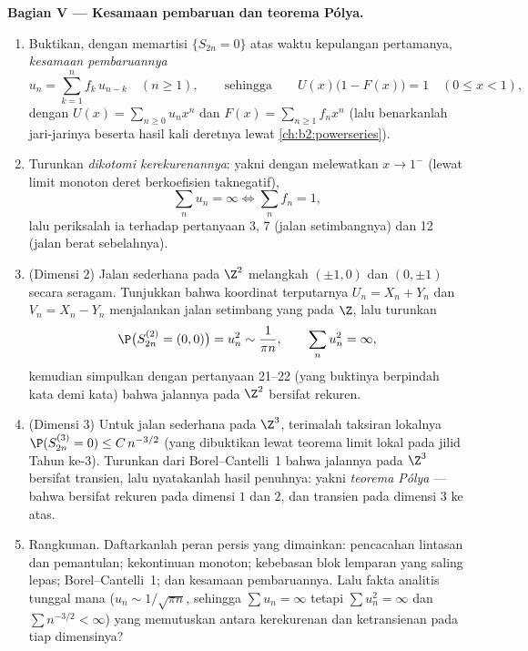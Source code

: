 \begin{problem}
\medskip
\noindent\textbf{Bagian V --- Kesamaan pembaruan dan
teorema Pólya.}
\begin{enumerate}[resume]
  \item Buktikan, dengan memartisi $\{S_{2n} = 0\}$ atas waktu
        kepulangan pertamanya, \emph{kesamaan pembaruannya}
        \[
        u_n = \sum_{k=1}^n f_k\,u_{n-k} \quad (n \geq 1),
        \qquad\text{sehingga}\qquad
        U(x)\bigl(1 - F(x)\bigr) = 1 \quad (0 \leq x < 1),
        \]
        dengan $U(x) = \sum_{n\geq0}u_nx^n$ dan $F(x) =
        \sum_{n\geq1}f_nx^n$ (lalu benarkanlah jari-jarinya beserta
        hasil kali deretnya lewat \cref{ch:b2:powerseries}).
  \item Turunkan \emph{dikotomi kerekurenannya}: yakni dengan melewatkan $x
        \to 1^-$ (lewat limit monoton deret berkoefisien taknegatif),
        \[
        \sum_n u_n = \infty \iff \sum_n f_n = 1 ,
        \]
        lalu periksalah ia terhadap pertanyaan 3, 7 (jalan setimbangnya) dan
        12 (jalan berat sebelahnya).
  \item (Dimensi $2$) Jalan sederhana pada $\Z^2$ melangkah
        $(\pm1, 0)$ dan $(0, \pm1)$ secara seragam. Tunjukkan bahwa
        koordinat terputarnya $U_n = X_n + Y_n$ dan $V_n = X_n
        - Y_n$ menjalankan jalan setimbang yang \emph{} pada
        $\Z$, lalu turunkan
        \[
        \P\bigl(S^{(2)}_{2n} = (0,0)\bigr) = u_n^2 \sim
        \frac1{\pi n},
        \qquad \sum_n u_n^2 = \infty ,
        \]
        kemudian simpulkan dengan pertanyaan 21--22 (yang buktinya
        berpindah kata demi kata) bahwa jalannya pada $\Z^2$ bersifat
        rekuren.
  \item (Dimensi $3$) Untuk jalan sederhana pada $\Z^3$, terimalah
        taksiran lokalnya $\P(S^{(3)}_{2n} = 0) \leq
        C\,n^{-3/2}$ (yang dibuktikan lewat teorema limit lokal pada
        jilid Tahun ke-3). Turunkan dari Borel--Cantelli~1
        bahwa jalannya pada $\Z^3$ bersifat transien, lalu nyatakanlah
        hasil penuhnya: yakni \emph{teorema Pólya} --- bahwa  bersifat rekuren pada dimensi $1$ dan $2$, dan
        transien pada dimensi $3$ ke atas.
  \item Rangkuman. Daftarkanlah peran persis yang dimainkan: pencacahan
        lintasan dan pemantulan; kekontinuan monoton;
        kebebasan blok lemparan yang saling lepas;
        Borel--Cantelli~1; dan kesamaan pembaruannya. Lalu fakta
        analitis tunggal mana ($u_n \sim 1/\sqrt{\pi n}$, sehingga
        $\sum u_n = \infty$ tetapi $\sum u_n^2 = \infty$ dan
        $\sum n^{-3/2} < \infty$) yang memutuskan antara kerekurenan
        dan ketransienan pada tiap dimensinya?

\end{enumerate}
\end{problem}
